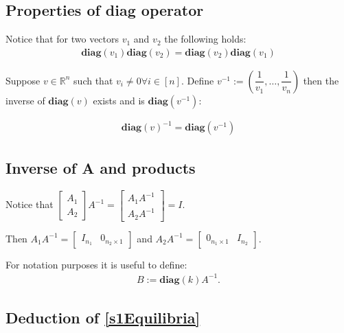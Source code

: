 \documentclass[3p,times]{elsarticle}
\newcommand{\R}{\mathbb{R}}
\newcommand{\diag}{\textbf{diag}}
\begin{document}
\subsection{Properties of diag operator}

Notice that for two vectors $v_1$ and $v_2$ the following holds:
\begin{align}
\diag(v_1)\diag(v_2) = \diag(v_2)\diag(v_1) 
\end{align}

Suppose $v \in \R^n$ such that $v_i \neq 0 \forall i \in [n]$. Define $v^{-1}:= \left( \dfrac{1}{v_1},\dots,\dfrac{1}{v_n} \right)$ then the inverse of $\diag(v)$ exists and is $\diag(v^{-1})$:

\begin{align}
\diag(v)^{-1} = \diag(v^{-1}) 
\end{align}

\subsection{Inverse of A and products}
Notice that $\begin{bmatrix}
A_1 \\ A_2
\end{bmatrix} A^{-1} = \begin{bmatrix}
A_1A^{-1} \\ A_2A^{-1}
\end{bmatrix}=I $.

Then $A_1A^{-1}= \begin{bmatrix}
I_{n_1}& 0_{n_2 \times 1} 
\end{bmatrix}$ and $A_2A^{-1}= \begin{bmatrix}
0_{n_1 \times 1} & I_{n_2}
\end{bmatrix}$.

For notation purposes it is useful to define: \begin{align}
B := \diag(k) A^{-1}.
\end{align}

\subsection{Deduction of  \eqref{s1Equilibria}}
\end{document}
